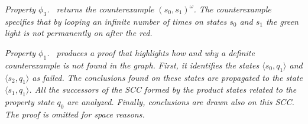 \emph{Property $\phi_3$. \NAME\ returns the counterexample $(s_0, s_1)^\omega$.
The counterexample specifies that by looping an infinite number of times on states $s_0$ and $s_1$ the green light is not permanently  on after the red. }

\emph{Property $\phi_1$. \NAME\  produces a proof that highlights how and why a definite counterexample is not found in the graph. First, it identifies the states $\langle s_0, q_1 \rangle$ and $\langle s_2, q_1 \rangle$ as failed. The conclusions found on these states are propagated to the state $\langle s_1, q_1 \rangle$. All the successors of the SCC formed by the product states related to the property state $q_0$ are analyzed. Finally, conclusions are drawn also on this SCC. 
The proof is omitted for space reasons.
}



